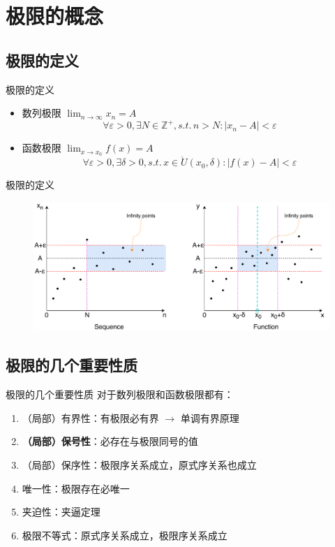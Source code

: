 \documentclass{myslide}
\begin{document}
\section{极限的概念}
\begin{frame}
\sectionpage
\end{frame}

\subsection{极限的定义}
\begin{frame}{极限的定义}
\begin{itemize}
	\item 数列极限 $\displaystyle\lim_{n\to\infty}x_n=A$
	\[\forall\varepsilon>0,\exists N\in\mathbb{Z}^+,s.t.\,n>N:|x_n-A|<\varepsilon\]
	\item 函数极限 $\displaystyle\lim_{x\to x_0}f(x)=A$
	\[\forall\varepsilon>0,\exists\delta>0,s.t.\,x\in\mathring{U}(x_0,\delta):|f(x)-A|<\varepsilon\]
\end{itemize}
\end{frame}

\begin{frame}{极限的定义}
\begin{figure}
\centering
\includegraphics[width=\linewidth]{fig/Limit_def.pdf}
\end{figure}
\end{frame}

\subsection{极限的几个重要性质}
\begin{frame}{极限的几个重要性质}
对于数列极限和函数极限都有：
\begin{enumerate}
	\item<1-> （局部）有界性：有极限必有界 $\to$ 单调有界原理
	\item<2-> \textbf{（局部）保号性}：必存在与极限同号的值
	\item<3-> （局部）保序性：极限序关系成立，原式序关系也成立
	\item<4-> 唯一性：极限存在必唯一
	\item<5-> 夹迫性：夹逼定理
	\item<6-> 极限不等式：原式序关系成立，极限序关系成立
\end{enumerate}
\end{frame}
\end{document}
